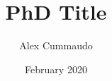 \title{PhD Title}
\author{Alex Cummaudo}
\date{February 2020}

\def \thedegree {Doctor of Philosophy}
\def \theinstitution {Applied Artificial Intelligence Institute\\Deakin University\\Melbourne, Australia}
\def \theauthorspostnominals {BSc \textit{Swinburne}, BIT(Hons)}